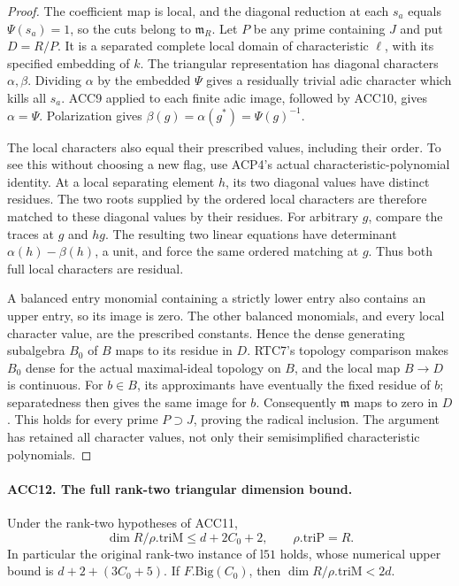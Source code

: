 \documentclass[11pt,a4paper]{article}
\numberwithin{equation}{section}
\theoremstyle{remark}\newtheorem{remark}[theorem]{Remark}
\begin{document}
\begin{proof}
The coefficient map is local, and the diagonal reduction at each
\(s_a\) equals \(\Psi(s_a)=1\), so the cuts belong to
\(\mathfrak m_R\).  Let \(P\) be any prime containing \(J\)
and put \(D=R/P\).  It is a separated complete local domain of
characteristic \(\ell\), with its specified embedding of \(k\).
The triangular representation has diagonal characters \(\alpha,
\beta\).  Dividing \(\alpha\) by the embedded \(\Psi\)
gives a residually trivial adic character which kills all \(s_a\).
ACC9 applied to each finite adic image, followed by ACC10, gives
\(\alpha=\Psi\).  Polarization gives
\(\beta(g)=\alpha(g^*)=\Psi(g)^{-1}\).

The local characters also equal their prescribed values, including
their order.  To see this without choosing a new flag, use ACP4's
actual characteristic-polynomial identity.  At a local separating
element \(h\), its two diagonal values have distinct residues.
The two roots supplied by the ordered local characters are therefore
matched to these diagonal values by their residues.  For arbitrary
\(g\), compare the traces at \(g\) and \(hg\).  The resulting
two linear equations have determinant
\(\alpha(h)-\beta(h)\), a unit, and force the same ordered
matching at \(g\).  Thus both full local characters are residual.

A balanced entry monomial containing a strictly lower entry also
contains an upper entry, so its image is zero.  The other balanced
monomials, and every local character value, are the prescribed
constants.  Hence the dense generating subalgebra \(B_0\) of
\(B\) maps to its residue in \(D\).  RTC7's topology comparison
makes \(B_0\) dense for the actual maximal-ideal topology on
\(B\), and the local map \(B\to D\) is continuous.  For
\(b\in B\), its approximants have eventually the fixed residue
of \(b\); separatedness then gives the same image for \(b\).
Consequently \(\mathfrak m\) maps to zero in \(D\).
This holds for every prime \(P\supset J\), proving the radical
inclusion.  The argument has retained all character values, not
only their semisimplified characteristic polynomials.
\end{proof}

\paragraph{ACC12. The full rank-two triangular dimension bound.}
\label{claim:ACC12}
Under the rank-two hypotheses of ACC11,
\[
 \dim R/\rho.\mathrm{triM}\le d+2C_0+2,
 \qquad \rho.\mathrm{triP}=R.                            \tag{ACC.20}
\]
In particular the original rank-two instance of \(\mathrm{l51}\)
holds, whose numerical upper bound is \(d+2+(3C_0+5)\).
If \(F.\mathrm{Big}(C_0)\), then
\(\dim R/\rho.\mathrm{triM}<2d\).
\end{document}
